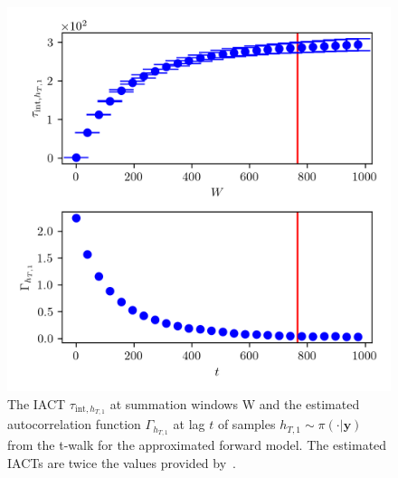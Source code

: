 \begin{figure}[ht!]
	\centering
	\includegraphics{UwerrTauIntTWalk3.png}
	\caption[IACT and autocorrelation function of samples $h_{T,1} \sim \pi(\cdot|\bm{y})$, for approximated model.]{The IACT $\tau_{\text{int},h_{T,1}}$ at summation windows W and the estimated autocorrelation function $\Gamma_{h_{T,1}}$ at lag $t$ of samples $h_{T,1} \sim \pi( \cdot| \bm{y})$ from the t-walk for the approximated forward model.
	The estimated IACTs are twice the values provided by~\cite{drikHesse, UwerrM}.}
	\label{fig:TWalkIATC4}
\end{figure}


